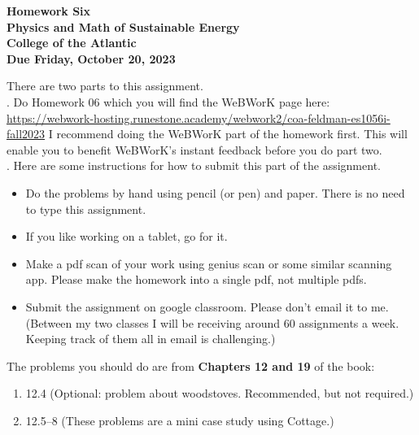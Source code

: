 \documentclass[12pt]{article}
\begin{document}
\pagestyle{empty}
 
\begin{center}
{\LARGE {\bf Homework Six}}\\
\bigskip
{\Large {\bf Physics and Math of Sustainable Energy}}\\
\bigskip
{\Large {\bf College of the Atlantic}}\\
\bigskip
{ {\bf Due Friday, October 20, 2023}}\\ 
\end{center}
\medskip


\noindent There are two parts to this assignment.\\

.  Do Homework 06 which you
will find the WeBWorK page here:
\url{https://webwork-hosting.runestone.academy/webwork2/coa-feldman-es1056i-fall2023}
I recommend doing the WeBWorK part of the homework first.  This will
enable you to benefit WeBWorK's instant feedback before you do part
two.\\ 


.  Here are some
instructions for how to submit this part of the assignment.
\begin{itemize}
\item Do the problems by hand using pencil (or pen) and paper.
  There is no need to type this assignment.
\item If you like working on a tablet, go for it. 
\item Make a pdf scan of your work using genius scan or some
  similar scanning app.  Please make the homework into a single
  pdf, not multiple pdfs.
\item Submit the assignment on google classroom.  Please don't
  email it to me.  (Between my two classes I will be receiving
  around 60 assignments a week.  Keeping track of them all in email 
  is challenging.)\\
\end{itemize}



\noindent The problems you should do are from {\bf Chapters 12 and 19} of the book:  \\ 

\begin{enumerate}
  \setlength{\itemsep}{-1mm}
  \item 12.4 (Optional: problem about woodstoves. Recommended, but not required.)
  \item 12.5–8 (These problems are a mini case study using Cottage.)\\
\end{enumerate}
\end{document}
